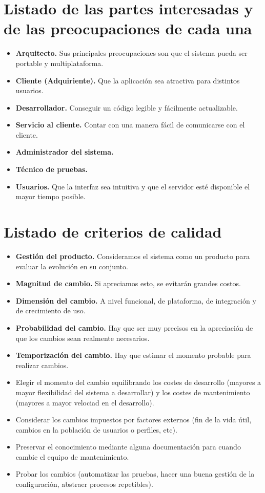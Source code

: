\documentclass{article}
\begin{document}
	\section{Listado de las partes interesadas y de las preocupaciones de cada una}
	\begin{itemize}
		\item {\bf Arquitecto.} Sus principales preocupaciones son que el sistema pueda ser portable y multiplataforma.
		\item {\bf Cliente (Adquiriente).} Que la aplicación sea atractiva para distintos usuarios.
		\item {\bf Desarrollador.} Conseguir un código legible y fácilmente actualizable.
		\item {\bf Servicio al cliente.} Contar con una manera fácil de comunicarse con el cliente.
		\item {\bf Administrador del sistema.} 
		\item {\bf Técnico de pruebas.} 
		\item {\bf Usuarios.} Que la interfaz sea intuitiva y que el servidor esté disponible el mayor tiempo posible.
	\end{itemize}

	\section{Listado de criterios de calidad}
	\begin{itemize}
		\item {\bf Gestión del producto.} Consideramos el sistema como un producto para evaluar la evolución en su conjunto.
		\item {\bf Magnitud de cambio.} Si apreciamos esto, se evitarán grandes costos.
		\item {\bf Dimensión del cambio.} A nivel funcional, de plataforma, de integración y de crecimiento de uso.
		\item {\bf Probabilidad del cambio.} Hay que ser muy precisos en la apreciación de que los cambios sean realmente necesarios.
		\item {\bf Temporización del cambio.} Hay que estimar el momento probable para realizar cambios.
		\item Elegir el momento del cambio equilibrando los costes de desarrollo (mayores a mayor flexibilidad del sistema a desarrollar) y los costes de mantenimiento (mayores a mayor velociad en el desarrollo).
		\item Considerar los cambios impuestos por factores externos (fin de la vida útil, cambios en la población de usuarios o perfiles, etc).
		\item Preservar el conocimiento mediante alguna documentación para cuando cambie el equipo de mantenimiento.
		\item Probar los cambios (automatizar las pruebas, hacer una buena gestión de la configuración, abstraer procesos repetibles).
	\end{itemize}
\end{document}

